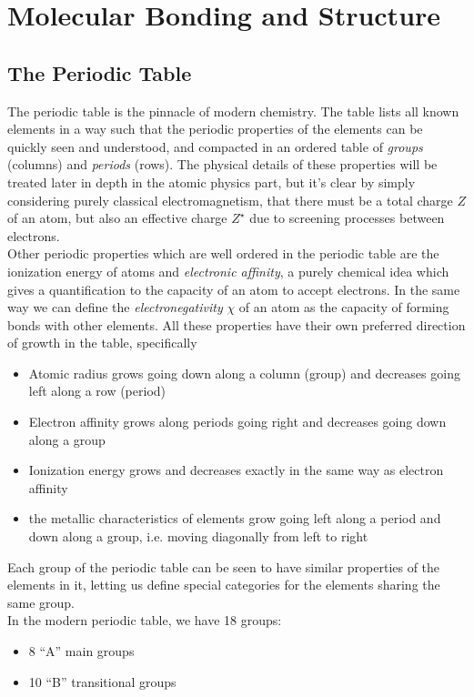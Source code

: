 \documentclass[../qm.tex]{subfiles}
\begin{document}
\section{Molecular Bonding and Structure}
\subsection{The Periodic Table}
The periodic table is the pinnacle of modern chemistry. The table lists all known elements in a way such that the periodic properties of the elements can be quickly seen and understood, and compacted in an ordered table of \emph{groups} (columns) and \emph{periods} (rows). The physical details of these properties will be treated later in depth in the atomic physics part, but it's clear by simply considering purely classical electromagnetism, that there must be a total charge $Z$ of an atom, but also an effective charge $Z^\star$ due to screening processes between electrons.\\
Other periodic properties which are well ordered in the periodic table are the ionization energy of atoms and \textit{electronic affinity}, a purely chemical idea which gives a quantification to the capacity of an atom to accept electrons. In the same way we can define the \textit{electronegativity} $\chi$ of an atom as the capacity of forming bonds with other elements. All these properties have their own preferred direction of growth in the table, specifically
\begin{itemize}
\item Atomic radius grows going down along a column (group) and decreases going left along a row (period)
\item Electron affinity grows along periods going right and decreases going down along a group
\item Ionization energy grows and decreases exactly in the same way as electron affinity
\item the metallic characteristics of elements grow going left along a period and down along a group, i.e. moving diagonally from left to right
\end{itemize}
Each group of the periodic table can be seen to have similar properties of the elements in it, letting us define special categories for the elements sharing the same group.\\
In the modern periodic table, we have 18 groups:
\begin{itemize}
\item 8 ``A'' main groups
\item 10 ``B'' transitional groups
\end{itemize}
\end{document}
